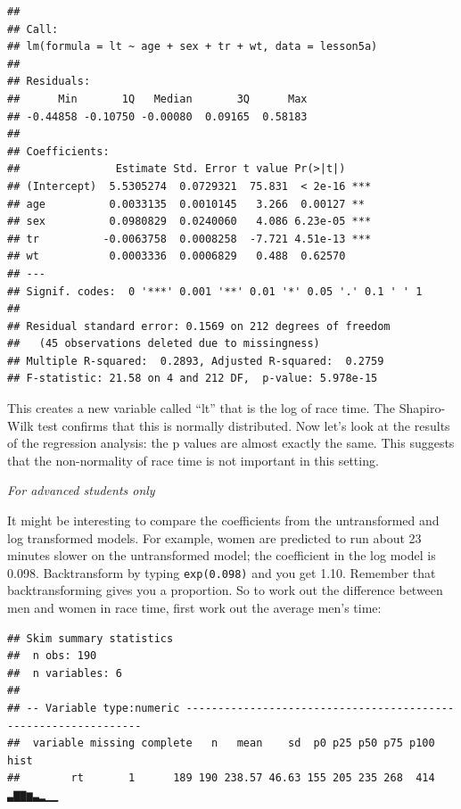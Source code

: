 \documentclass[]{book}
\newenvironment{Shaded}{\begin{snugshade}}{\end{snugshade}}
\newcommand{\CommentTok}[1]{\textcolor[rgb]{0.56,0.35,0.01}{\textit{#1}}}
\newcommand{\DecValTok}[1]{\textcolor[rgb]{0.00,0.00,0.81}{#1}}
\newcommand{\KeywordTok}[1]{\textcolor[rgb]{0.13,0.29,0.53}{\textbf{#1}}}
\newcommand{\NormalTok}[1]{#1}
\newcommand{\OperatorTok}[1]{\textcolor[rgb]{0.81,0.36,0.00}{\textbf{#1}}}
\newcommand{\StringTok}[1]{\textcolor[rgb]{0.31,0.60,0.02}{#1}}
\begin{document}
\begin{verbatim}
## 
## Call:
## lm(formula = lt ~ age + sex + tr + wt, data = lesson5a)
## 
## Residuals:
##      Min       1Q   Median       3Q      Max 
## -0.44858 -0.10750 -0.00080  0.09165  0.58183 
## 
## Coefficients:
##               Estimate Std. Error t value Pr(>|t|)    
## (Intercept)  5.5305274  0.0729321  75.831  < 2e-16 ***
## age          0.0033135  0.0010145   3.266  0.00127 ** 
## sex          0.0980829  0.0240060   4.086 6.23e-05 ***
## tr          -0.0063758  0.0008258  -7.721 4.51e-13 ***
## wt           0.0003336  0.0006829   0.488  0.62570    
## ---
## Signif. codes:  0 '***' 0.001 '**' 0.01 '*' 0.05 '.' 0.1 ' ' 1
## 
## Residual standard error: 0.1569 on 212 degrees of freedom
##   (45 observations deleted due to missingness)
## Multiple R-squared:  0.2893, Adjusted R-squared:  0.2759 
## F-statistic: 21.58 on 4 and 212 DF,  p-value: 5.978e-15
\end{verbatim}

This creates a new variable called ``lt'' that is the log of race time.
The Shapiro-Wilk test confirms that this is normally distributed. Now
let's look at the results of the regression analysis: the p values are
almost exactly the same. This suggests that the non-normality of race
time is not important in this setting.

\emph{For advanced students only}

It might be interesting to compare the coefficients from the
untransformed and log transformed models. For example, women are
predicted to run about 23 minutes slower on the untransformed model; the
coefficient in the log model is 0.098. Backtransform by typing
\texttt{exp(0.098)} and you get 1.10. Remember that backtransforming
gives you a proportion. So to work out the difference between men and
women in race time, first work out the average men's time:

\begin{Shaded}
\end{Shaded}

\begin{verbatim}
## Skim summary statistics
##  n obs: 190 
##  n variables: 6 
## 
## -- Variable type:numeric ---------------------------------------------------------------
##  variable missing complete   n   mean    sd  p0 p25 p50 p75 p100     hist
##        rt       1      189 190 238.57 46.63 155 205 235 268  414 ▃▇▇▆▃▂▁▁
\end{verbatim}
\end{document}
